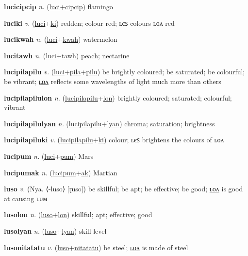 \textbf{\hypertarget{lucicipcip}{lucicipcip}} \textit{n.} (\hyperlink{luci}{luci}+\allowbreak \hyperlink{cipcip}{cipcip})
flamingo

\textbf{\hypertarget{luciki}{luciki}} \textit{v.} (\hyperlink{luci}{luci}+\allowbreak \hyperlink{ki}{ki})
redden; colour red; ʟєꜱ colours ʟᴏᴧ red

\textbf{\hypertarget{lucikwah}{lucikwah}} \textit{n.} (\hyperlink{luci}{luci}+\allowbreak \hyperlink{kwah}{kwah})
watermelon

\textbf{\hypertarget{lucitawh}{lucitawh}} \textit{n.} (\hyperlink{luci}{luci}+\allowbreak \hyperlink{tawh}{tawh})
peach; nectarine

\textbf{\hypertarget{lucipilapilu}{lucipilapilu}} \textit{v.} (\hyperlink{luci}{luci}+\allowbreak \hyperlink{pila}{pila}+\allowbreak \hyperlink{pilu}{pilu})
be brightly coloured; be saturated; be colourful; be vibrant; \hyperlink{lucipilapilulon}{ʟᴏᴧ} reflects some wavelengths of light much more than others

\textbf{\hypertarget{lucipilapilulon}{lucipilapilulon}} \textit{n.} (\hyperlink{lucipilapilu}{lucipilapilu}+\allowbreak \hyperlink{lon}{lon})
brightly coloured; saturated; colourful; vibrant

\textbf{\hypertarget{lucipilapilulyan}{lucipilapilulyan}} \textit{n.} (\hyperlink{lucipilapilu}{lucipilapilu}+\allowbreak \hyperlink{lyan}{lyan})
chroma; saturation; brightness

\textbf{\hypertarget{lucipilapiluki}{lucipilapiluki}} \textit{v.} (\hyperlink{lucipilapilu}{lucipilapilu}+\allowbreak \hyperlink{ki}{ki})
colour; ʟєꜱ brightens the colours of ʟᴏᴧ

\textbf{\hypertarget{lucipum}{lucipum}} \textit{n.} (\hyperlink{luci}{luci}+\allowbreak \hyperlink{pum}{pum})
Mars

\textbf{\hypertarget{lucipumak}{lucipumak}} \textit{n.} (\hyperlink{lucipum}{lucipum}+\allowbreak \hyperlink{ak}{ak})
Martian

\textbf{\hypertarget{luso}{luso}} \textit{v.} (Nya. ⟨-luso⟩ [ɽuso])
be skillful; be apt; be effective; be good; \hyperlink{lusolon}{ʟᴏᴧ} is good at causing ʟᴜᴍ

\textbf{\hypertarget{lusolon}{lusolon}} \textit{n.} (\hyperlink{luso}{luso}+\allowbreak \hyperlink{lon}{lon})
skillful; apt; effective; good

\textbf{\hypertarget{lusolyan}{lusolyan}} \textit{n.} (\hyperlink{luso}{luso}+\allowbreak \hyperlink{lyan}{lyan})
skill level

\textbf{\hypertarget{lusonitatatu}{lusonitatatu}} \textit{v.} (\hyperlink{luso}{luso}+\allowbreak \hyperlink{nitatatu}{nitatatu})
be steel; \hyperlink{lusonitatatulon}{ʟᴏᴧ} is made of steel

